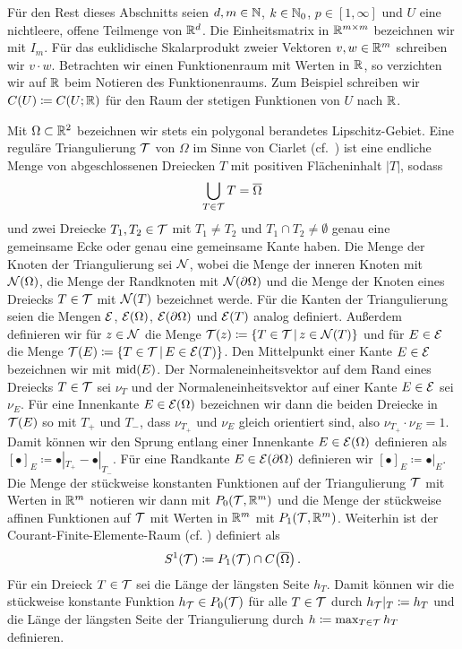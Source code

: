 Für den Rest dieses Abschnitts seien $d,m\in\mathbb{N}$, $k\in\mathbb{N}_0$,
$p\in[1,\infty]$ und $U$ eine nichtleere, offene Teilmenge von $\mathbb{R}^d$.
Die Einheitsmatrix in $\mathbb{R}^{m\times m}$ bezeichnen wir mit $I_m$.
Für das euklidische Skalarprodukt zweier Vektoren $v,w\in \mathbb{R}^m$ schreiben wir
$v\cdot w$.
Betrachten wir einen Funktionenraum mit Werten in $\mathbb{R}$, so verzichten wir auf
$\mathbb{R}$ beim Notieren des Funktionenraums. Zum Beispiel schreiben wir 
$C(U)\coloneqq C(U;\mathbb{R})$ für den Raum der stetigen Funktionen von $U$ nach
$\mathbb{R}$.

Mit $\Omega\subset\mathbb{R}^2$ bezeichnen wir stets ein polygonal berandetes
Lipschitz-Gebiet. 
Eine reguläre Triangulierung $\mathcal{T}$ von $\Omega$ im Sinne von Ciarlet (cf.\
\cites[34]{Car09b}[345]{CGR12}[S. 8 f.]{CGKNRR10}) ist eine endliche Menge von
abgeschlossenen Dreiecken $T$ mit positiven Flächeninhalt $|T|$, sodass
\begin{align*}
  \bigcup_{T\in\mathcal{T}} T=\overline{\Omega}
\end{align*}
und zwei Dreiecke $T_1,T_2\in\mathcal{T}$ mit $T_1\neq T_2$ und $T_1\cap
T_2\neq\emptyset$ genau eine gemeinsame Ecke oder genau eine gemeinsame Kante
haben.
Die Menge der Knoten der Triangulierung sei $\mathcal{N}$, wobei die Menge der
inneren Knoten mit $\mathcal{N}(\Omega)$, die Menge der Randknoten mit
$\mathcal{N}(\partial\Omega)$ und die Menge der Knoten eines Dreiecks $T\in\mathcal{T}$ mit
$\mathcal{N}(T)$ bezeichnet werde. 
Für die Kanten der Triangulierung seien die Mengen $\mathcal{E}$, $\mathcal{E}(\Omega)$,
$\mathcal{E}(\partial\Omega)$ und $\mathcal{E}(T)$ analog definiert.  
Außerdem definieren wir für $z\in\mathcal{N}$ die Menge $\mathcal{T}(z)\coloneqq
\{T\in\mathcal{T}\,|\,z\in\mathcal{N}(T)\}$ und für $E\in\mathcal{E}$ die Menge
$\mathcal{T}(E)\coloneqq \{T\in\mathcal{T}\,|\,E\in\mathcal{E}(T)\}$. 
Den Mittelpunkt einer Kante $E\in\mathcal{E}$ bezeichnen wir mit $\textup{mid}(E)$.
Der Normaleneinheitsvektor auf dem Rand eines Dreiecks $T\in\mathcal{T}$ sei
$\nu_T$ und der Normaleneinheitsvektor auf einer Kante $E\in\mathcal{E}$ sei
$\nu_E$. 
Für eine Innenkante $E\in\mathcal{E}(\Omega)$ bezeichnen wir dann die beiden
Dreiecke in $\mathcal{T}(E)$  so mit $T_+$ und $T_-$, dass
$\nu_{T_+}$ und $\nu_E$ gleich orientiert sind, also $\nu_{T_+}\cdot\nu_E=1$.
Damit können wir den Sprung entlang einer Innenkante $E\in\mathcal{E}(\Omega)$
definieren als $[\bullet]_E\coloneqq \bullet|_{T_+} -\bullet|_{T_-}$.
Für eine Randkante $E\in\mathcal{E}(\partial\Omega)$ definieren wir
$[\bullet]_E\coloneqq \bullet|_E$.
Die Menge der stückweise konstanten Funktionen auf der Triangulierung $\mathcal{T}$
mit Werten in $\mathbb{R}^m$ notieren wir dann mit $ P_0\!\left(\mathcal{T},\mathbb{R}^m\right)$
und die Menge der stückweise affinen Funktionen auf $\mathcal{T}$ mit Werten in
$\mathbb{R}^m$ mit $ P_1\!\left(\mathcal{T},\mathbb{R}^m\right)$. 
Weiterhin ist der Courant-Finite-Elemente-Raum (cf. \cite[12]{CGKNRR10})
definiert als
\begin{align*}
  S^1(\mathcal{T})\coloneqq P_1(\mathcal{T})\cap C\!\left(\overline{\Omega}\right).
\end{align*}
Für ein Dreieck $T\in\mathcal{T}$ sei die Länge der längsten Seite $h_T$. 
Damit können wir die stückweise konstante Funktion $h_{\mathcal{T}}\in P_0(\mathcal{T})$ für
alle $T\in\mathcal{T}$ durch $h_{\mathcal{T}}|_T\coloneqq h_T$ und die Länge der längsten
Seite der Triangulierung durch $h\coloneqq\max_{T\in\mathcal{T}}h_T$ definieren.

